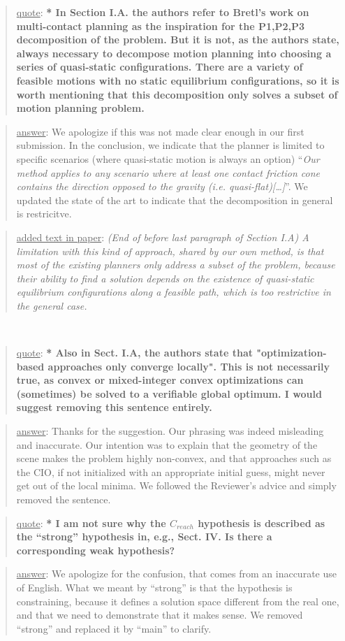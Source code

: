 \documentclass[a4paper]{article}
\newcommand{\done}[0]{}
\newcommand\quot[1]{\begin{quote} \underline{quote}: \textbf{#1}\end{quote}}
\newcommand\as[1]{\begin{quote} \underline{answer}: {#1}\end{quote} }
\newcommand\qt[1]{\begin{quote} \underline{added text in paper}: \textit{#1}\end{quote} \leavevmode \\ }
\begin{document}
\quot{* In Section I.A. the authors refer to Bretl's work on multi-contact
planning as the inspiration for the P1,P2,P3 decomposition of the
problem. But it is not, as the authors state, always necessary to
decompose motion planning into choosing a series of quasi-static
configurations. There are a variety of feasible motions with no static
equilibrium configurations, so it is worth mentioning that this
decomposition only solves a subset of motion planning problem.}
\as{We apologize if this was not made clear enough in our first submission. In the conclusion, we indicate that the planner is limited to specific scenarios (where quasi-static motion
is always an option) ``\textit{Our method applies to any scenario where at least one
contact friction cone contains the direction opposed to the
gravity (i.e. quasi-flat)[\dots]}''. We updated the state of the art to indicate that the decomposition in general is restricitve.}
\qt{(End of before last paragraph of Section I.A) A limitation with
this kind of approach, shared by our own method, is that most of the existing planners only address a subset of the problem, because their ability to find a solution depends
on the existence of quasi-static equilibrium configurations along a feasible path, which is too restrictive in the general case.}\done

\quot{* Also in Sect. I.A, the authors state that "optimization-based
approaches only converge locally". This is not necessarily true, as
convex or mixed-integer convex optimizations can (sometimes) be solved
to a verifiable global optimum. I would suggest removing this sentence
entirely.}
\as{Thanks for the suggestion. Our phrasing was indeed misleading and inaccurate. Our intention was to explain that the geometry of the scene makes the problem highly non-convex, and
that approaches such as the CIO, if not initialized with an appropriate initial guess, might never get out of the local minima. We followed the Reviewer's advice and simply removed the sentence. }\done

\quot{* I am not sure why the $C_{reach}$ hypothesis is described as the ``strong''
hypothesis in, e.g., Sect. IV. Is there a corresponding weak
hypothesis?}
\as{We apologize for the confusion, that comes from an inaccurate use of English. What we meant by ``strong'' is that the hypothesis is constraining, because
it defines a solution space different from the real one, and that we need to demonstrate that it makes sense.  We removed ``strong'' and replaced it by ``main'' to clarify. }\done
\end{document}
